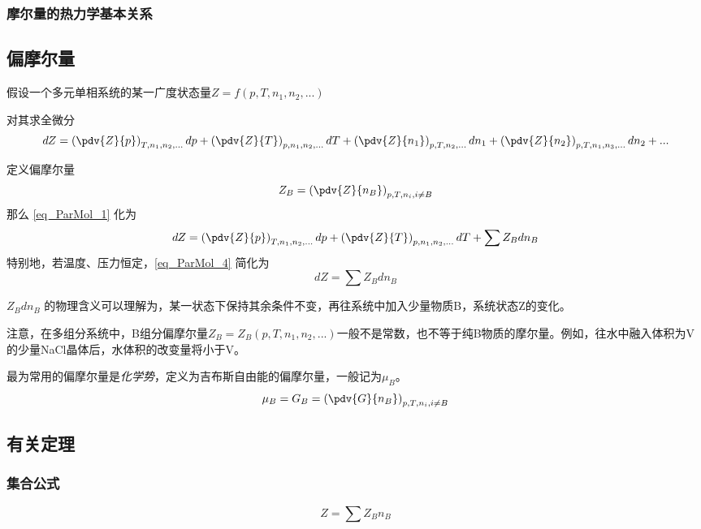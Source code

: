 \subsubsection{摩尔量的热力学基本关系}


\subsection{偏摩尔量}
假设一个多元单相系统的某一广度状态量$Z=f(p,T,n_1,n_2,...)$

对其求全微分
\begin{equation}\label{eq_ParMol_1}
dZ = \left(\pdv{Z}{p}\right)_{T,n_1,n_2,...}dp + \left(\pdv{Z}{T}\right)_{p,n_1,n_2,...}dT+\left(\pdv{Z}{n_1}\right)_{p,T,n_2,...}dn_1+\left(\pdv{Z}{n_2}\right)_{p,T,n_1,n_3,...}dn_2+...
\end{equation}

定义偏摩尔量
\begin{equation}
{Z_B} = \left(\pdv{Z}{n_B}\right)_{p,T,n_i, i \neq B} 
\end{equation}
那么 \autoref{eq_ParMol_1} 化为 
\begin{equation}\label{eq_ParMol_4}
dZ = \left(\pdv{Z}{p}\right)_{T,n_1,n_2,...}dp + \left(\pdv{Z}{T}\right)_{p,n_1,n_2,...}dT+\sum {Z_B} dn_B
\end{equation}
特别地，若温度、压力恒定，\autoref{eq_ParMol_4} 简化为
\begin{equation}\label{eq_ParMol_3}
dZ = \sum {Z_B} dn_B
\end{equation}

${Z_B} d n_B$ 的物理含义可以理解为，某一状态下保持其余条件不变，再往系统中加入少量物质B，系统状态Z的变化。

注意，在多组分系统中，B组分偏摩尔量${Z_B}={Z_B}(p,T,n_1,n_2,...)$一般不是常数，也不等于纯B物质的摩尔量。例如，往水中融入体积为V的少量NaCl晶体后，水体积的改变量将小于V。

最为常用的偏摩尔量是\textsl{化学势}，定义为吉布斯自由能的偏摩尔量，一般记为$\mu_B$。
\begin{equation}
\mu_B={G_B} = \left(\pdv{G}{n_B}\right)_{p,T,n_i, i \neq B} 
\end{equation}

\subsection{有关定理}
\subsubsection{集合公式}
\begin{equation}\label{eq_ParMol_2}
Z=\sum {Z_B}  n_B
\end{equation}


